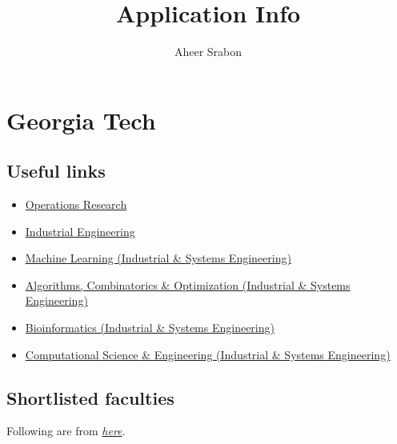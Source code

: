 

\title{Application Info}
\author{Aheer Srabon}


\maketitle

\section{Georgia Tech}

\subsection{Useful links}

\begin{itemize}
    \item \href{https://gradapp.gatech.edu/portal/program-info?cmd=view-program&program=452a9c60-776b-70d7-ab17-476e7ad6982b}{Operations Research}
    \item \href{https://gradapp.gatech.edu/portal/program-info?cmd=view-program&program=9a0380b6-d43b-4f9d-6659-ac0b2bdb103b}{Industrial Engineering}
    \item \href{https://gradapp.gatech.edu/portal/program-info?cmd=view-program&program=e9070580-7dbc-9892-14f6-552f68403df0}{Machine Learning (Industrial \& Systems Engineering)}
    \item \href{https://gradapp.gatech.edu/portal/program-info?cmd=view-program&program=f35fa328-8795-5357-8f4b-29d4b08683ea}{Algorithms, Combinatorics \& Optimization (Industrial \& Systems Engineering)}
    \item \href{https://gradapp.gatech.edu/portal/program-info?cmd=view-program&program=3715f5ce-b854-c461-3d9c-52ece673ec05}{Bioinformatics (Industrial \& Systems Engineering)}
    \item \href{https://gradapp.gatech.edu/portal/program-info?cmd=view-program&program=1618251d-f5dd-5b3c-a429-f1228692ddb0}{Computational Science \& Engineering (Industrial \& Systems Engineering)}
\end{itemize}

\subsection{Shortlisted faculties}

Following are from \href{https://cse.gatech.edu/data-science-and-visual-analytics}{\emph{here}}.

